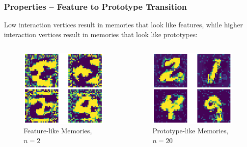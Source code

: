 \begin{frame}
    \frametitle{Properties -- Feature to Prototype Transition}

Low interaction vertices result in memories that look like features, while higher interaction vertices result in memories that look like prototypes:

\begin{columns}
    \begin{figure}
        \includegraphics[width=\textwidth]{images/featureDetector.png}
        \caption{Feature-like Memories, \(n=2\)}
    \end{figure}

    \begin{figure}
        \includegraphics[width=\textwidth]{images/prototypeMemory.png}
        \caption{Prototype-like Memories, \(n=20\)}
    \end{figure}
\end{columns}
\end{frame}